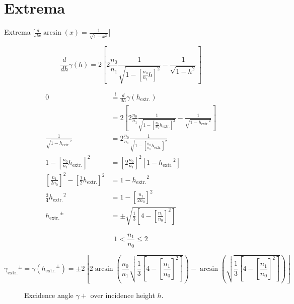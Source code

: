 \documentclass[pagesize=pdftex,paper=a4,fontsize=12pt]{scrartcl}
\begin{document}
\section{Extrema}

Extrema [$\frac{d}{dx} \arcsin(x) = \frac{1}{\sqrt{1-x^2}}$]

\[ \frac{d}{dh} \gamma (h) = 2 \left[2 \frac{n_0}{n_1} \frac{1}{\sqrt{1-[\frac{n_0}{n_1} h]^2}} - \frac{1}{\sqrt{1-h^2}}\right] \]

\newcommand{\hExtremum}{\ensuremath{h_{\text{extr.}}}}
\newcommand{\gammaExtremum}{\ensuremath{\gamma_{\text{extr.}}}}
\begin{align}
	0 & \stackrel{!}{=} \frac{d}{dh} \gamma (\hExtremum)\\
 & = 2 \left[2 \frac{n_0}{n_1} \frac{1}{\sqrt{1-[\frac{n_0}{n_1} \hExtremum]^2}} - \frac{1}{\sqrt{1-\hExtremum^2}}\right] \nonumber \\[.5em]
	\frac{1}{\sqrt{1-\hExtremum^2}} &= 2 \frac{n_0}{n_1} \frac{1}{\sqrt{1-[\frac{n_0}{n_1} \hExtremum]^2}} \nonumber \\[.5em]
	1-\left[\frac{n_0}{n_1} \hExtremum\right]^2 &= \left[2 \frac{n_0}{n_1}\right]^2 \left[1-\hExtremum^2\right] \nonumber \\[.5em]
	\left[\frac{n_1}{2 n_0}\right]^2 -\left[\frac{1}{2} \hExtremum\right]^2 &=  1-\hExtremum^2 \nonumber \\[.5em]
	\frac{3}{4} \hExtremum^2 &=  1 - \left[\frac{n_1}{2 n_0}\right]^2 \nonumber \\[.5em]
	\hExtremum^{\pm} &= \pm \sqrt{\frac{1}{3} \left[4 - \left[\frac{n_1}{n_0}\right]^2\right]}
\end{align}

\begin{equation}
	 1 < \frac{n_1}{n_0} \leq 2
\end{equation}

\begin{equation}
	\gammaExtremum^{\pm} = \gamma (\hExtremum^{\pm}) = \pm 2 \left[2 \arcsin\left(\frac{n_0}{n_1} \sqrt{\frac{1}{3} \left[4 - \left[\frac{n_1}{n_0}\right]^2\right]}\right) - \arcsin\left(\sqrt{\frac{1}{3} \left[4 - \left[\frac{n_1}{n_0}\right]^2\right]}\right)\right]
\end{equation}


\begin{figure}[H]
	\centering
	\caption{Excidence angle $\gamma{+}$ over incidence height $h$.}
	\label{fig:GammaMaxOverRefractiveIndexRelation}
\end{figure}
\end{document}
